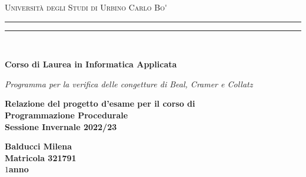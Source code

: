 \documentclass[10pt]{report}
\begin{document}
\begin{titlepage}

    \begin{center}
    {{\Large{\textsc{Università degli Studi di Urbino Carlo Bo\'}}}} 
    \rule[0.1cm]{15.8cm}{0.1mm}
    \rule[0.5cm]{15.8cm}{0.6mm}
    \\\vspace{2mm}
    
    {\normalsize{\bf Corso di Laurea in Informatica Applicata}}
    
    \end{center}
    
    \vspace{60mm}
    
    \begin{center}
    {\LARGE\emph{Programma per la verifica delle congetture di Beal, Cramer e Collatz}} 
    \end{center}
    
    \vspace{10mm}
    
    \begin{center}
    {\LARGE{\bf Relazione del progetto d'esame per il corso di \\Programmazione Procedurale \\ 
    \vspace{3mm} Sessione Invernale 2022/23 }}
    \end{center}
    
    \vspace{30mm} \par \noindent
    
    \begin{center}
    {\large{\bf Balducci Milena\\
    Matricola 321791\\
    $1$\textdegree anno}}
    \end{center}
    \vspace{20mm}
\end{titlepage}

\newpage
\end{document}

